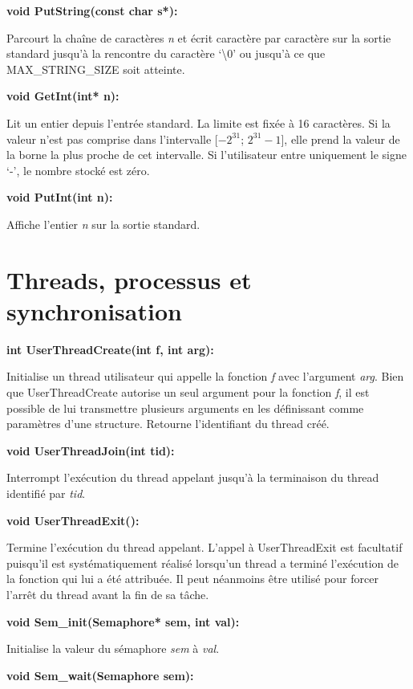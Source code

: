 \documentclass[12pt]{report}
\begin{document}
\bigskip
\textbf{void PutString(const char s*):}

Parcourt la chaîne de caractères \textit{n} et écrit caractère par caractère sur la
sortie standard jusqu'à la rencontre du caractère `\textbackslash 0' ou jusqu'à
ce que MAX\_STRING\_SIZE soit atteinte.


\bigskip
\textbf{void GetInt(int* n):}

Lit un entier depuis l'entrée standard. La limite est fixée à 16 caractères. Si la valeur n'est pas comprise dans l'intervalle [$-2^{31}$;
$2^{31}-1$],  elle prend la valeur de la borne la plus proche de cet intervalle. Si l'utilisateur entre uniquement le signe `-', le nombre stocké est zéro.
\bigskip

\textbf{void PutInt(int n):}

Affiche l'entier \textit{n} sur la sortie standard.\\


\section{Threads, processus et synchronisation}
\bigskip

\textbf{int UserThreadCreate(int f, int arg):}

Initialise un thread utilisateur qui appelle la fonction \textit{f} avec l'argument \textit{arg}. Bien que UserThreadCreate autorise un seul argument pour la fonction \textit{f}, il est possible de lui transmettre plusieurs arguments en les définissant comme paramètres d'une structure.
Retourne l’identifiant du thread créé.
\bigskip

\textbf{void UserThreadJoin(int tid):}

Interrompt l'exécution du thread appelant jusqu'à la terminaison du thread identifié par \textit{tid}.
\bigskip


\textbf{void UserThreadExit():}

Termine l'exécution du thread appelant. L'appel à UserThreadExit est facultatif puisqu'il est systématiquement réalisé lorsqu'un thread a terminé l'exécution de la fonction qui lui a été attribuée. Il peut néanmoins être utilisé pour forcer l'arrêt du thread avant la fin de sa tâche.
\bigskip


\textbf{void Sem\_init(Semaphore* sem, int val):}

Initialise la valeur du sémaphore \textit{sem} à \textit{val}.
\bigskip	


\textbf{void Sem\_wait(Semaphore sem):}
\end{document}

